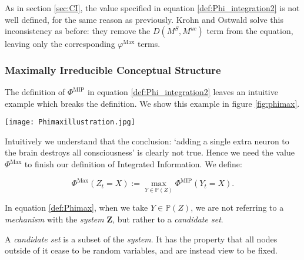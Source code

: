 \begin{remark}
	As in section \ref{sec:CI}, the value specified in equation \ref{def:Phi_integration2} is not well defined, for the same reason as previously. Krohn and Ostwald solve this inconsistency  as before: they remove the $D(M^S, M^{uc})$ term from the equation, leaving only the corresponding $\varphi^{\text{Max}}$ terms.
\end{remark}

\subsubsection{Maximally Irreducible Conceptual Structure}

The definition of $\Phi^{\text{MIP}}$ in equation \ref{def:Phi_integration2} leaves an intuitive example which breaks the definition. We show this example in figure \ref{fig:phimax}. 

\begin{SCfigure}
	\centering
	\texttt{[image: Phimaxillustration.jpg]}
	\caption{We show a dense cluster of nodes which if taken to be the \textit{system} generates a large $\Phi^{\text{MIP}}$ in the shaded background. Now we add an extra node to this system. Given how this new node is sparsely linked to the original system, the MIP will simply be cutting off this node, resulting in a small change. The result of this is that $\Phi^{\text{MIP}}$ for the new system would be very small.}
	\label{fig:phimax}
\end{SCfigure}

Intuitively we understand that the conclusion: `adding a single extra neuron to the brain destroys all consciousness' is clearly not true. Hence we need the value $\Phi^{\text{Max}}$ to finish our definition of Integrated Information. We define:

\begin{equation}
\label{def:Phimax}
\Phi^{\text{Max}}(Z_t = X) := \max \limits_{Y \in \mathbb{P}(Z)}\Phi^{\text{MIP}} (Y_t = X).
\end{equation}

In equation \ref{def:Phimax}, when we take $Y \in \mathbb{P}(Z)$, we are not referring to a \textit{mechanism} with the \textit{system} $\mathbf{Z}$, but rather to a \textit{candidate set}.

\begin{definition}
	A \textit{candidate set} \cite{oizumi2014phenomenology} is a subset of the \textit{system}. It has the property that all nodes outside of it cease to be random variables, and are instead view to be fixed.  
\end{definition}

